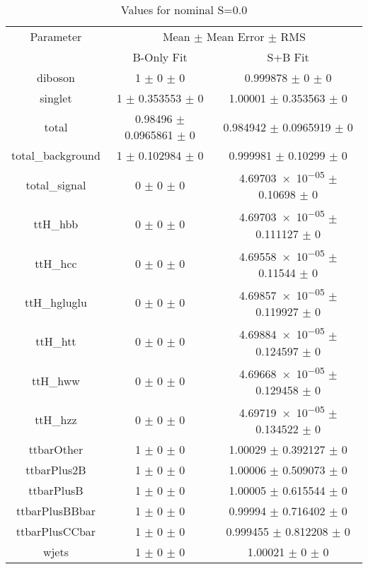 \begin{table}
\centering
\caption{Values for nominal S=0.0}
\begin{tabular}{ccc}
\toprule
Parameter & \multicolumn{2}{c}{Mean $\pm$ Mean Error $\pm$ RMS}\\
 & B-Only Fit & S+B Fit\\
\midrule
diboson & \num{1} $\pm$ \num{0} $\pm$ \num{0} & \num{0.999878} $\pm$ \num{0} $\pm$ \num{0}\\
singlet & \num{1} $\pm$ \num{0.353553} $\pm$ \num{0} & \num{1.00001} $\pm$ \num{0.353563} $\pm$ \num{0}\\
total & \num{0.98496} $\pm$ \num{0.0965861} $\pm$ \num{0} & \num{0.984942} $\pm$ \num{0.0965919} $\pm$ \num{0}\\
total\_background & \num{1} $\pm$ \num{0.102984} $\pm$ \num{0} & \num{0.999981} $\pm$ \num{0.10299} $\pm$ \num{0}\\
total\_signal & \num{0} $\pm$ \num{0} $\pm$ \num{0} & \num{4.69703e-05} $\pm$ \num{0.10698} $\pm$ \num{0}\\
ttH\_hbb & \num{0} $\pm$ \num{0} $\pm$ \num{0} & \num{4.69703e-05} $\pm$ \num{0.111127} $\pm$ \num{0}\\
ttH\_hcc & \num{0} $\pm$ \num{0} $\pm$ \num{0} & \num{4.69558e-05} $\pm$ \num{0.11544} $\pm$ \num{0}\\
ttH\_hgluglu & \num{0} $\pm$ \num{0} $\pm$ \num{0} & \num{4.69857e-05} $\pm$ \num{0.119927} $\pm$ \num{0}\\
ttH\_htt & \num{0} $\pm$ \num{0} $\pm$ \num{0} & \num{4.69884e-05} $\pm$ \num{0.124597} $\pm$ \num{0}\\
ttH\_hww & \num{0} $\pm$ \num{0} $\pm$ \num{0} & \num{4.69668e-05} $\pm$ \num{0.129458} $\pm$ \num{0}\\
ttH\_hzz & \num{0} $\pm$ \num{0} $\pm$ \num{0} & \num{4.69719e-05} $\pm$ \num{0.134522} $\pm$ \num{0}\\
ttbarOther & \num{1} $\pm$ \num{0} $\pm$ \num{0} & \num{1.00029} $\pm$ \num{0.392127} $\pm$ \num{0}\\
ttbarPlus2B & \num{1} $\pm$ \num{0} $\pm$ \num{0} & \num{1.00006} $\pm$ \num{0.509073} $\pm$ \num{0}\\
ttbarPlusB & \num{1} $\pm$ \num{0} $\pm$ \num{0} & \num{1.00005} $\pm$ \num{0.615544} $\pm$ \num{0}\\
ttbarPlusBBbar & \num{1} $\pm$ \num{0} $\pm$ \num{0} & \num{0.99994} $\pm$ \num{0.716402} $\pm$ \num{0}\\
ttbarPlusCCbar & \num{1} $\pm$ \num{0} $\pm$ \num{0} & \num{0.999455} $\pm$ \num{0.812208} $\pm$ \num{0}\\
wjets & \num{1} $\pm$ \num{0} $\pm$ \num{0} & \num{1.00021} $\pm$ \num{0} $\pm$ \num{0}\\
\bottomrule
\end{tabular}
\end{table}